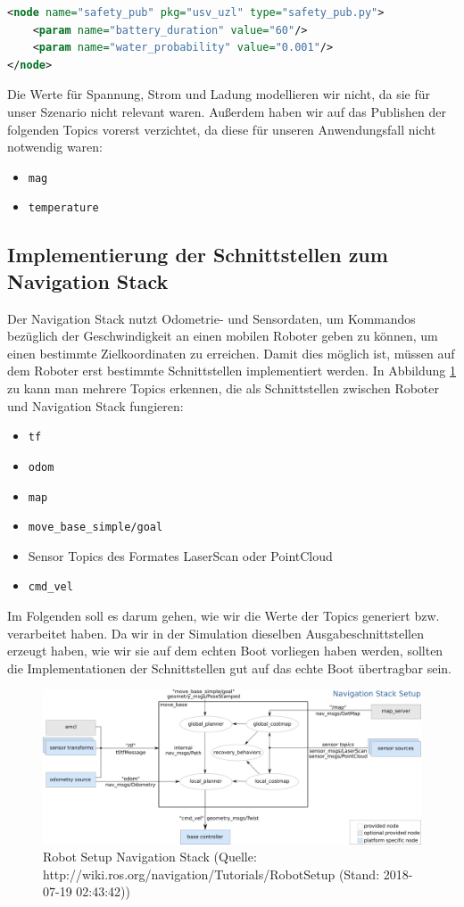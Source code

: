 \documentclass[11pt]{article}
\begin{document}
\begin{lstlisting}[language=xml]
<node name="safety_pub" pkg="usv_uzl" type="safety_pub.py">
    <param name="battery_duration" value="60"/>
    <param name="water_probability" value="0.001"/>
</node>
\end{lstlisting}

Die Werte für Spannung, Strom und Ladung modellieren wir nicht, da sie für unser Szenario nicht relevant waren.
Außerdem haben wir auf das Publishen der folgenden Topics vorerst verzichtet, da diese für unseren Anwendungsfall nicht notwendig waren:
\begin{itemize}
	\item \texttt{mag}
	\item \texttt{temperature}
\end{itemize}

\subsection{Implementierung der Schnittstellen zum Navigation Stack}
Der Navigation Stack nutzt Odometrie- und Sensordaten, um Kommandos bezüglich der Geschwindigkeit an einen mobilen Roboter geben zu können, um einen bestimmte Zielkoordinaten zu erreichen. Damit dies möglich ist, müssen auf dem Roboter erst bestimmte Schnittstellen implementiert werden\cite{NavWiki}. In Abbildung \ref{nav} zu kann man mehrere Topics erkennen, die als Schnittstellen zwischen Roboter und Navigation Stack fungieren:
\begin{itemize}
	\item \texttt{tf}
	\item \texttt{odom}
	\item \texttt{map}
	\item \texttt{move\_base\_simple/goal}
	\item Sensor Topics des Formates LaserScan oder PointCloud
	\item \texttt{cmd\_vel}
\end{itemize}
Im Folgenden soll es darum gehen, wie wir die Werte der Topics generiert bzw. verarbeitet haben. Da wir in der Simulation dieselben Ausgabeschnittstellen erzeugt haben, wie wir sie auf dem echten Boot vorliegen haben werden, sollten die Implementationen der Schnittstellen gut auf das echte Boot übertragbar sein.

\begin{figure}[h]
	\includegraphics[width=\linewidth]{overview_tf.png}
	\caption{Robot Setup Navigation Stack (Quelle: http://wiki.ros.org/navigation/Tutorials/RobotSetup (Stand: 2018-07-19 02:43:42))}
	\label{nav}
\end{figure}
\end{document}
